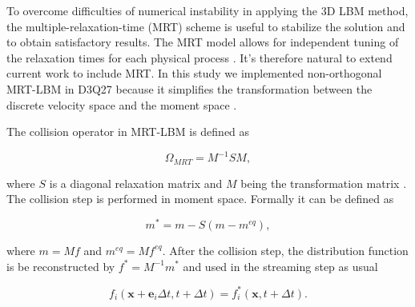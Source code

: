 To overcome difficulties of numerical instability in applying the 3D LBM method, the multiple-relaxation-time (MRT) scheme is useful to stabilize the solution and to obtain satisfactory results. The MRT model allows for independent tuning of the relaxation times for each physical process \citep{sugaD3Q27MultiplerelaxationtimeLattice2015}. It's therefore natural to extend current work to include MRT. In this study we implemented non-orthogonal MRT-LBM in D3Q27 because it simplifies the transformation between the discrete velocity space and the moment space \citep{feiModelingRealisticMultiphase2019}.

The collision operator in MRT-LBM is defined as 

\begin{equation}
	\Omega_{MRT} = M^{-1} SM,
\end{equation}

where $S$ is a diagonal relaxation matrix and $M$ being the transformation matrix \citep{feiModelingRealisticMultiphase2019}. The collision step is performed in moment space. Formally it can be defined as

\begin{equation}
	m^* = m - S(m-m^{eq}),
\end{equation}

where $m = Mf$ and $m^{eq} = Mf^{eq}$. After the collision step, the distribution function is be reconstructed by $f^* = M^{-1}m^*$ and used in the streaming step as usual

\begin{equation}
	\label{eq:lbe-post-collision}
	f_i (\bm{x}+\bm{e}_i\Delta t,t+\Delta t) = f^{*}_i (\bm{x},t+\Delta t).
\end{equation}



